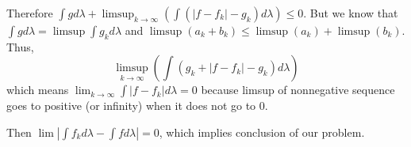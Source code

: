Therefore $\int g d\lambda + \limsup_{k\rightarrow \infty }\left( \int \left( \left | f- f_k \right| - g_k \right)d\lambda \right) \leq 0$. But we know that $\int g d\lambda = \limsup\int g_k d\lambda$ and $\limsup\left( a_k + b_k  \right) \leq \limsup\left( a_k  \right) + \limsup \left( b_k \right) $.
Thus, \begin{equation*}
	\limsup_{k\rightarrow \infty } \left(  \int \left( g_k + \left | f - f_k  \right | - g_k  \right) d\lambda  \right)
\end{equation*}
which means $\lim_{k\rightarrow \infty } \int \left| f - f_k \right | d\lambda = 0$ because limsup of nonnegative sequence goes to positive (or infinity) when it does not go to 0.

Then $\lim \left | \int f_k d\lambda - \int f d\lambda  \right | = 0$, which implies conclusion of our problem.\\
